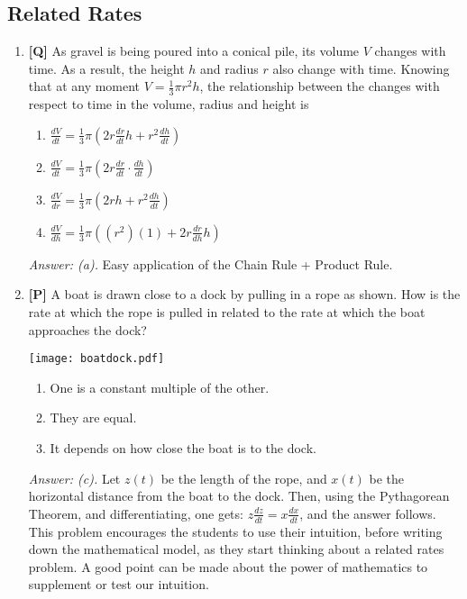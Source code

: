 \documentclass[12pt]{article}
\begin{document}
\subsection{Related Rates}

\begin{enumerate}

\item {\bf [Q]} As gravel is being poured into a conical pile, its volume $V$ changes with time. 
As a result, the height $h$ and radius $r$ also change with time. Knowing that at any moment $V=\frac{1}{3}\pi r^2 h$, the relationship between the changes with respect to time in the volume, radius and height is
\begin {enumerate}
\item $\displaystyle{\frac{dV}{dt}=\frac{1}{3}\pi \left( 2r\frac{dr}{dt} h+r^2\frac{dh}{dt}\right)}$
\item $\displaystyle{\frac{dV}{dt}=\frac{1}{3}\pi \left( 2r\frac{dr}{dt} \cdot \frac{dh}{dt}\right)}$
\item $\displaystyle{\frac{dV}{dr}=\frac{1}{3}\pi \left( 2rh+r^2\frac{dh}{dt}\right)}$
\item $\displaystyle{\frac{dV}{dh}=\frac{1}{3}\pi \left( (r^2)(1)+2r\frac{dr}{dh}h\right)}$
\end{enumerate}

{\it Answer: (a).} Easy application of the Chain Rule + Product Rule.

\item {\bf [P]}
A boat is drawn close to a dock by pulling in a rope as shown.  How is
the rate at which the rope is pulled in related to the rate at
which the boat approaches the dock?

\begin{center}
\texttt{[image: boatdock.pdf]}
\end{center}

\begin{enumerate}
\renewcommand{\theenumii}{\alph{enumii}}
\item One is a constant multiple of the other.
\item They are equal.
\item It depends on how close the boat is to the dock.
\end{enumerate}

{\it Answer: (c).}  Let $z(t)$ be the length of the rope, and $x(t)$ 
be the horizontal distance from the boat to the dock. Then, using the 
Pythagorean Theorem, and differentiating, one gets:  
$\displaystyle {z \frac{dz}{dt}=x \frac{dx}{dt}}$, and the answer follows. 
This problem encourages the students to use
their intuition, before writing down the mathematical model, as
they start thinking about a related rates problem. A good point
can be made about the power of mathematics to supplement or test
our intuition.


\end{enumerate}
\end{document}
